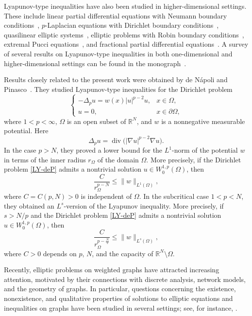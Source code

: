 \documentclass[twoside,12pt,letter]{article}
\theoremstyle{plain}
\theoremstyle{definition}
\theoremstyle{remark}
\numberwithin{equation}{section}
\begin{document}
Lyapunov-type inequalities have also been studied in higher-dimensional
settings. These include linear partial differential equations with Neumann
boundary conditions~\cite{Canada}, \(p\)-Laplacian equations with Dirichlet
boundary conditions~\cite{deNapoliPinasco2016}, quasilinear elliptic
systems~\cite{deNapoliPinasco2006}, elliptic problems with Robin boundary
conditions~\cite{HA}, extremal Pucci equations~\cite{Tyagi}, and fractional
partial differential equations~\cite{JKS}. A survey of several results on
Lyapunov-type inequalities in both one-dimensional and higher-dimensional
settings can be found in the monograph~\cite{Pinasco-13}.

Results closely related to the present work were obtained by de N\'apoli and
Pinasco~\cite{deNapoliPinasco2016}.  They studied Lyapunov-type inequalities for the Dirichlet problem
\begin{equation}\label{LY-deP}
\left\{
\begin{array}{ll}
-\Delta_p u=w(x)|u|^{p-2}u, & x\in\Omega,\\[2mm]
u=0, & x\in\partial\Omega,
\end{array}
\right.
\end{equation}
where \(1<p<\infty\), \(\Omega\) is an open subset of \(\mathbb R^N\), and
\(w\) is a nonnegative measurable potential. Here
\[
\Delta_p u=\operatorname{div}\bigl(|\nabla u|^{p-2}\nabla u\bigr).
\]
In the case \(p>N\), they proved a lower bound for the \(L^1\)-norm of the
potential \(w\) in terms of the inner radius \(r_\Omega\) of the domain
\(\Omega\). More precisely, if the Dirichlet problem \eqref{LY-deP} admits a
nontrivial solution \(u\in W_0^{1,p}(\Omega)\), then
\[
\frac{C}{r_\Omega^{p-N}}
\le
\|w\|_{L^1(\Omega)},
\]
where \(C=C(p,N)>0\) is independent of \(\Omega\).  In the subcritical case \(1<p<N\), they obtained an \(L^s\)-version of the
Lyapunov inequality. More precisely, if \(s>N/p\) and the Dirichlet problem
\eqref{LY-deP} admits a nontrivial solution \(u\in W_0^{1,p}(\Omega)\), then
\begin{equation}\label{Pin-plN}
\frac{C}{r_\Omega^{p-\frac Ns}}
\le
\|w\|_{L^s(\Omega)},
\end{equation}
where \(C>0\) depends on \(p\), \(N\), and the capacity of
\(\mathbb R^N\setminus\Omega\).


Recently, elliptic problems on weighted graphs have attracted increasing
attention, motivated by their connections with discrete analysis, network
models, and the geometry of graphs. In particular, questions concerning the
existence, nonexistence, and qualitative properties of solutions to elliptic
equations and inequalities on graphs have been studied in several settings;
see, for instance,
\cite{DuongMinh2025,Grigoryan2018,Grigoryan2016,Gu,Meglioli,MonticelliPunzoSomaglia2025}.
\end{document}

